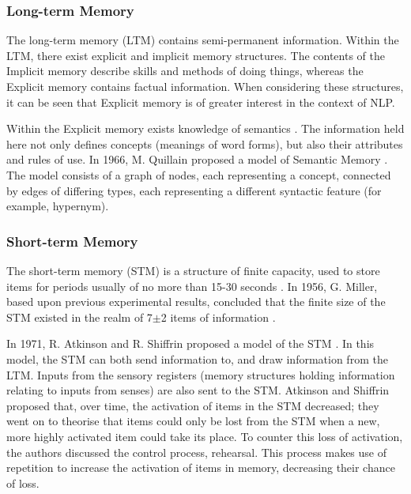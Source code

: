 \documentclass[]{article}
\begin{document}
\subsubsection{Long-term Memory}
\label{LongTerm}
The long-term memory (LTM) contains semi-permanent information. Within the LTM, there exist explicit and implicit memory structures. The contents of the Implicit memory describe skills and methods of doing things, whereas the Explicit memory contains factual information\cite{MemoryBaddeleyEysenkAnderson}. When considering these structures, it can be seen that Explicit memory is of greater interest in the context of NLP.

Within the Explicit memory exists knowledge of semantics \cite{MemoryBaddeleyEysenkAnderson}. The information held here not only defines concepts (meanings of word forms), but also their attributes and rules of use. In 1966, M. Quillain proposed a model of Semantic Memory \cite{SemanticMemoryQuillain}. The model consists of a graph of nodes, each representing a concept, connected by edges of differing types, each representing a different syntactic feature (for example, hypernym).  


\subsubsection{Short-term Memory}
\label{ShortTerm}
The short-term memory (STM) is a structure of finite capacity, used to store items for periods usually of no more than 15-30 seconds \cite{MemoryBaddeleyEysenkAnderson}. In 1956, G. Miller, based upon previous experimental results, concluded that the finite size of the STM existed in the realm of 7$\pm$2 items of information \cite{SevenPlusMinusTwo}. 

In 1971, R. Atkinson and R. Shiffrin proposed a model of the STM \cite{ControlProcessesSTMAtkinson}. In this model, the STM can both send information to, and draw information from the LTM. Inputs from the sensory registers (memory structures holding information relating to inputs from senses) are also sent to the STM. Atkinson and Shiffrin proposed that, over time, the activation of items in the STM decreased; they went on to theorise that items could only be lost from the STM when a new, more highly activated item could take its place. To counter this loss of activation, the authors discussed the control process, rehearsal. This process makes use of repetition to increase the activation of items in memory, decreasing their chance of loss. 
\end{document}
